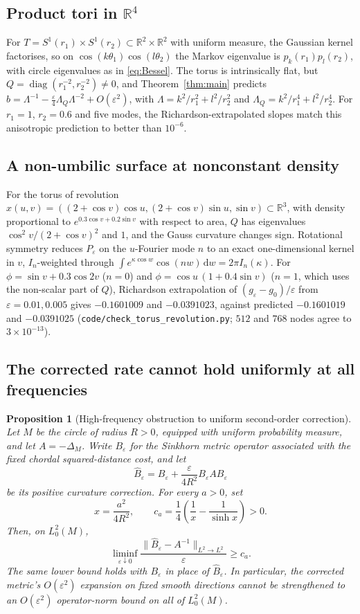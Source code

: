 \documentclass[11pt,a4paper]{article}
\newtheorem{proposition}[theorem]{Proposition}
\theoremstyle{definition}\newtheorem{definition}[theorem]{Definition}
\theoremstyle{remark}\newtheorem{remark}[theorem]{Remark}
\newcommand{\eps}{\varepsilon}
\newcommand{\dd}{\,\mathrm d}
\newcommand{\R}{\mathbb R}
\begin{document}
\subsection{Product tori in $\R^4$}
For $T=S^1(r_1)\times S^1(r_2)\subset\R^2\times\R^2$ with uniform measure, the Gaussian kernel factorises, so on $\cos(k\theta_1)\cos(l\theta_2)$ the Markov eigenvalue is $p_k(r_1)p_l(r_2)$, with circle eigenvalues as in \eqref{eq:Bessel}. The torus is intrinsically flat, but $Q=\operatorname{diag}(r_1^{-2},r_2^{-2})\neq0$, and Theorem~\ref{thm:main} predicts
$b=\Lambda^{-1}-\tfrac\eps4\Lambda_Q\Lambda^{-2}+O(\eps^2)$, with $\Lambda=k^2/r_1^2+l^2/r_2^2$ and $\Lambda_Q=k^2/r_1^4+l^2/r_2^4$. For $r_1=1$, $r_2=0.6$ and five modes, the Richardson-extrapolated slopes match this anisotropic prediction to better than $10^{-6}$.

\subsection{A non-umbilic surface at nonconstant density}
For the torus of revolution $x(u,v)=((2+\cos v)\cos u,(2+\cos v)\sin u,\sin v)\subset\R^3$, with density proportional to $e^{0.3\cos v+0.2\sin v}$ with respect to area, $Q$ has eigenvalues $\cos^2v/(2+\cos v)^2$ and $1$, and the Gauss curvature changes sign. Rotational symmetry reduces $P_\eps$ on the $u$-Fourier mode $n$ to an exact one-dimensional kernel in $v$, $I_n$-weighted through $\int e^{\kappa\cos w}\cos(nw)\dd w=2\pi I_n(\kappa)$. For $\phi=\sin v+0.3\cos2v$ ($n=0$) and $\phi=\cos u\,(1+0.4\sin v)$ ($n=1$, which uses the non-scalar part of $Q$), Richardson extrapolation of $(g_\eps-g_0)/\eps$ from $\eps=0.01,0.005$ gives $-0.1601009$ and $-0.0391023$, against predicted $-0.1601019$ and $-0.0391025$ (\texttt{code/check\_torus\_revolution.py}; $512$ and $768$ nodes agree to $3\times10^{-13}$).

\subsection{The corrected rate cannot hold uniformly at all frequencies}

\begin{proposition}[High-frequency obstruction to uniform second-order correction]
\label{prop:circle-high-frequency}
Let $M$ be the circle of radius $R>0$, equipped with uniform probability
measure, and let $A=-\Delta_M$.  Write $B_\varepsilon$ for the Sinkhorn
metric operator associated with the fixed chordal squared-distance cost,
and let
\[
 \widehat B_\varepsilon
   =B_\varepsilon+
     \frac{\varepsilon}{4R^2}B_\varepsilon A B_\varepsilon
\]
be its positive curvature correction.  For every $a>0$, set
\[
 x=\frac{a^2}{4R^2},\qquad
 c_a=\frac14\left(\frac1x-\frac1{\sinh x}\right)>0.
\]
Then, on $L^2_0(M)$,
\[
 \liminf_{\varepsilon\downarrow0}
  \frac{\|\widehat B_\varepsilon-A^{-1}\|_{L^2\to L^2}}{\varepsilon}
 \ge c_a.
\]
The same lower bound holds with $B_\varepsilon$ in place of
$\widehat B_\varepsilon$.  In particular, the corrected metric's
$O(\varepsilon^2)$ expansion on fixed smooth directions cannot be
strengthened to an $O(\varepsilon^2)$ operator-norm bound on all of
$L^2_0(M)$.
\end{proposition}
\end{document}
